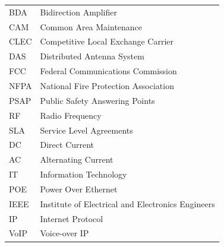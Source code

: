 \documentclass{thesis}
\begin{document}
\begin{tabular}{ l l }
  \hspace{1cm} BDA & \hspace{2cm} Bidirection Amplifier \\
  \hspace{1cm} CAM & \hspace{2cm} Common Area Maintenance \\
  \hspace{1cm} CLEC & \hspace{2cm} Competitive Local Exchange Carrier \\
  \hspace{1cm} DAS & \hspace{2cm} Distributed Antenna System \\
  \hspace{1cm} FCC & \hspace{2cm} Federal Communications Commission \\
  \hspace{1cm} NFPA & \hspace{2cm} National Fire Protection Association \\
  \hspace{1cm} PSAP & \hspace{2cm} Public Safety Answering Points \\
  \hspace{1cm} RF & \hspace{2cm} Radio Frequency \\
  \hspace{1cm} SLA & \hspace{2cm} Service Level Agreements \\
  \hspace{1cm} DC & \hspace{2cm} Direct Current \\
  \hspace{1cm} AC & \hspace{2cm} Alternating Current \\
  \hspace{1cm} IT & \hspace{2cm} Information Technology \\
  \hspace{1cm} POE & \hspace{2cm} Power Over Ethernet \\
  \hspace{1cm} IEEE & \hspace{2cm} Institute of Electrical and
  Electronics Engineers \\
  \hspace{1cm} IP & \hspace{2cm} Internet Protocol \\
  \hspace{1cm} VoIP & \hspace{2cm} Voice-over IP \\

\end{tabular}
\newpage
\end{document}

